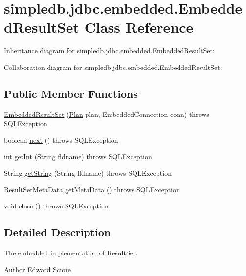 \hypertarget{classsimpledb_1_1jdbc_1_1embedded_1_1EmbeddedResultSet}{}\section{simpledb.\+jdbc.\+embedded.\+Embedded\+Result\+Set Class Reference}
\label{classsimpledb_1_1jdbc_1_1embedded_1_1EmbeddedResultSet}


Inheritance diagram for simpledb.\+jdbc.\+embedded.\+Embedded\+Result\+Set\+:


Collaboration diagram for simpledb.\+jdbc.\+embedded.\+Embedded\+Result\+Set\+:
\subsection*{Public Member Functions}
\begin{DoxyCompactItemize}
\item 
\hyperlink{classsimpledb_1_1jdbc_1_1embedded_1_1EmbeddedResultSet_ad521b9af5962a1cc69e82d7225a28e58}{Embedded\+Result\+Set} (\hyperlink{interfacesimpledb_1_1plan_1_1Plan}{Plan} plan, Embedded\+Connection conn)  throws S\+Q\+L\+Exception 
\item 
boolean \hyperlink{classsimpledb_1_1jdbc_1_1embedded_1_1EmbeddedResultSet_a9d8476584bd75cdb7bad151ed5977511}{next} ()  throws S\+Q\+L\+Exception 
\item 
int \hyperlink{classsimpledb_1_1jdbc_1_1embedded_1_1EmbeddedResultSet_a00652d799b354e50aa01f2a6c9b517ac}{get\+Int} (String fldname)  throws S\+Q\+L\+Exception 
\item 
String \hyperlink{classsimpledb_1_1jdbc_1_1embedded_1_1EmbeddedResultSet_ab98291535370c4200baad93bab9e8d58}{get\+String} (String fldname)  throws S\+Q\+L\+Exception 
\item 
Result\+Set\+Meta\+Data \hyperlink{classsimpledb_1_1jdbc_1_1embedded_1_1EmbeddedResultSet_ab48eda09a1aca7c9860716c28b5eb833}{get\+Meta\+Data} ()  throws S\+Q\+L\+Exception 
\item 
void \hyperlink{classsimpledb_1_1jdbc_1_1embedded_1_1EmbeddedResultSet_ac93184388c9508b087ecae9b183a78b0}{close} ()  throws S\+Q\+L\+Exception 
\end{DoxyCompactItemize}


\subsection{Detailed Description}
The embedded implementation of Result\+Set. \begin{DoxyAuthor}{Author}
Edward Sciore 
\end{DoxyAuthor}


